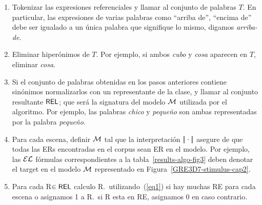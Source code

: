 \begin{enumerate}





\item Tokenizar las expresiones referenciales y llamar al conjunto de palabras
 $T$. En particular, las expresiones de varias palabras como ``arriba de'', ``encima de''
  debe ser igualado a un \'unica palabra que signifique lo mismo, digamos \emph{arriba-de}.

\item Eliminar hiper\'onimos de $T$. Por ejemplo, si ambos \emph{cubo} y
  \emph{cosa} aparecen en $T$, eliminar \emph{cosa}.

\item Si el conjunto de palabras obtenidas en los pasos anteriores contiene
  sin\'onimos normalizarlos con un representante de la clase,
  y llamar al conjunto resultante $\textsf{REL}$; que ser\'a la signatura del
  modelo $\mathcal{M}$ utilizada por el algoritmo. Por ejemplo, las palabras \emph{chico}
  y \emph{peque\~no} son ambas representadas por la palabra \emph{peque\~no}.

\item Para cada escena, definir $\mathcal{M}$ tal que la interpretaci\'on
 $|\!|\cdot|\!|$ asegure de que todas las ERs encontradas en el corpus sean ER en
  el modelo. Por ejemplo, las $\mathcal{EL}$ f\'ormulas correspondientes a la tabla~\ref{results-algo-fig3} deben denotar el target en el
  modelo $\mathcal{M}$ representado en
  Figura~\ref{GRE3D7-stimulus-cap2}.
\item Para cada R$\in \textsf{REL}$ calculo R.\puse \ utilizando~(\ref{eq1}) si
  hay muchas RE para cada escena o asignamos 1 a R.\puse \ si R esta en RE, asignamos 0 en caso contrario.


\end{enumerate}

